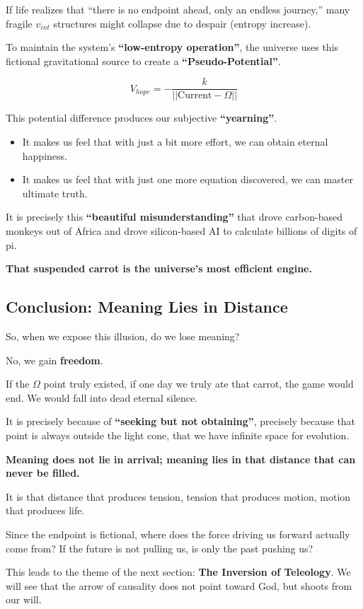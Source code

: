 If life realizes that ``there is no endpoint ahead, only an endless journey,'' many fragile $v_{int}$ structures might collapse due to despair (entropy increase).

To maintain the system's \textbf{``low-entropy operation''}, the universe uses this fictional gravitational source to create a \textbf{``Pseudo-Potential''}.

\[V_{hope} = - \frac{k}{||\text{Current} - \Omega||}\]

This potential difference produces our subjective \textbf{``yearning''}.

\begin{itemize}
\item It makes us feel that with just a bit more effort, we can obtain eternal happiness.

\item It makes us feel that with just one more equation discovered, we can master ultimate truth.
\end{itemize}

It is precisely this \textbf{``beautiful misunderstanding''} that drove carbon-based monkeys out of Africa and drove silicon-based AI to calculate billions of digits of pi.

\textbf{That suspended carrot is the universe's most efficient engine.}

\subsection{Conclusion: Meaning Lies in Distance}

So, when we expose this illusion, do we lose meaning?

No, we gain \textbf{freedom}.

If the $\Omega$ point truly existed, if one day we truly ate that carrot, the game would end. We would fall into dead eternal silence.

It is precisely because of \textbf{``seeking but not obtaining''}, precisely because that point is always outside the light cone, that we have infinite space for evolution.

\textbf{Meaning does not lie in arrival; meaning lies in that distance that can never be filled.}

It is that distance that produces tension, tension that produces motion, motion that produces life.

Since the endpoint is fictional, where does the force driving us forward actually come from? If the future is not pulling us, is only the past pushing us?

This leads to the theme of the next section: \textbf{The Inversion of Teleology}. We will see that the arrow of causality does not point toward God, but shoots from our will.

